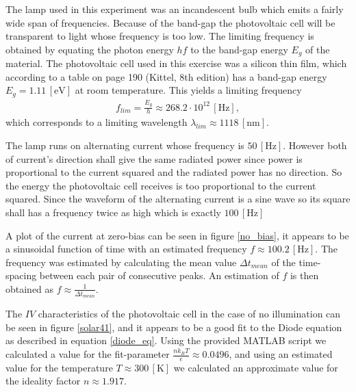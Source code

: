 \documentclass[a4paper]{article}
\begin{document}
The lamp used in this experiment was an incandescent bulb which emits a fairly wide span of frequencies. Because of the band-gap the photovoltaic cell will be transparent to light whose frequency is too low. The limiting frequency is obtained by equating the photon energy $h f$ to the band-gap energy $E_g$ of the material. The photovoltaic cell used in this exercise was a silicon thin film, which according to a table on page 190 (Kittel, 8th edition) has a band-gap energy $E_g = 1.11 \,\mathrm{[eV]}$ at room temperature. This yields a limiting frequency
\begin{align}
	f_{lim} = \frac{E_g}{h} \approx 268.2 \cdot 10^{12} \,\mathrm{[Hz]},
\end{align}
which corresponds to a limiting wavelength $\lambda_{lim} \approx 1118 \,\mathrm{[nm]}$.


The lamp runs on alternating current whose frequency is $50 \,\mathrm{[Hz]}$. However both of current's direction shall give the same radiated power since power is proportional to the current squared and the radiated power has no direction. So the energy the photovoltaic cell receives is too proportional to the current squared. Since the waveform of the alternating current is a sine wave so its square shall has a frequency twice as high which is exactly $100 \,\mathrm{[Hz]}$

A plot of the current at zero-bias can be seen in figure \ref{no_bias}, it appears to be a sinusoidal function of time with an estimated frequency $f \approx 100.2 \,\mathrm{[Hz]}$. The frequency was estimated by calculating the mean value $\Delta t_{mean}$ of the time-spacing between each pair of consecutive peaks. An estimation of $f$ is then obtained as $f \approx \frac{1}{\Delta t_{mean}}$.

The $IV$ characteristics of the photovoltaic cell in the case of no illumination can be seen in figure \ref{solar41}, and it appears to be a good fit to the Diode equation as described in equation \ref{diode_eq}. Using the provided MATLAB script we calculated a value for the fit-parameter $\frac{n k_B T}{e} \approx 0.0496$, and using an estimated value for the temperature $T \approx 300 \,\mathrm{[K]}$ we calculated an approximate value for the ideality factor $n \approx 1.917$.
\end{document}
